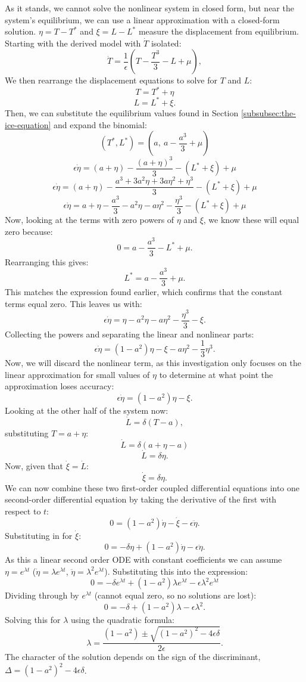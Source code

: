     As it stands, we cannot solve the nonlinear system in closed form, but near the system's equilibrium, we can use a linear approximation with a closed-form solution. $\eta=T-T^*$ and $\xi=L-L^*$ measure the displacement from equilibrium. Starting with the derived model with $\dot T$ isolated:
    \[
        \dot{T}=\frac{1}{\epsilon}\left(T-\frac{T^3}{3}-L+\mu\right),
    \]
    We then rearrange the displacement equations to solve for $T$ and $L$:
    \[
        T=T^*+\eta
    \]
    \[
        L=L^*+\xi.
    \]
    Then, we can substitute the equilibrium values found in Section \ref{subsubsec:the-ice-equation} and expand the binomial:
    \[
        \left(T^*,L^*\right)=\left(a, \ a-\frac{a^3}{3}+\mu\right)
    \]
    \[
        \epsilon\dot \eta=(a+\eta)-\frac{(a+\eta)^3}{3}-(L^*+\xi)+\mu
    \]
    \[
        \epsilon\dot \eta=(a+\eta)-\frac{a^3+3a^2\eta+3a\eta^2+\eta^3}{3}-(L^*+\xi)+\mu
    \]
    \[
        \epsilon\dot\eta=a+\eta-\frac{a^3}{3}-a^2\eta-a\eta^2-\frac{\eta^3}{3}-(L^*+\xi)+\mu
    \]
    Now, looking at the terms with zero powers of $\eta$ and $\xi$, we know these will equal zero because:
    \[
        0=a-\frac{a^3}{3}-L^*+\mu.
    \]
    Rearranging this gives:
    \[
        L^*=a-\frac{a^3}{3}+\mu.
    \]
    This matches the expression found earlier, which confirms that the constant terms equal zero. This leaves us with:
    \[
        \epsilon\dot\eta=\eta-a^2\eta-a\eta^2-\frac{\eta^3}{3}-\xi.
    \]
    Collecting the powers and separating the linear and nonlinear parts:
    \[
        \epsilon\dot\eta=\left(1-a^2\right)\eta-\xi-a\eta^2-\frac{1}{3}\eta^3.
    \]
    Now, we will discard the nonlinear term, as this investigation only focuses on the linear approximation for small values of $\eta$ to determine at what point the approximation loses accuracy:
    \[
        \epsilon\dot\eta=\left(1-a^2\right)\eta-\xi.
    \]
    Looking at the other half of the system now:
    \[
        \dot L=\delta(T-a),
    \]
    substituting $T=a+\eta$:
    \[
        \dot L = \delta(a+\eta-a)
    \]
    \[
        \dot L = \delta\eta.
    \]
    Now, given that $\dot\xi=\dot L$:
    \[
        \dot\xi=\delta\eta.
    \]
    We can now combine these two first-order coupled differential equations into one second-order differential equation by taking the derivative of the first with respect to $t$:
    \[
        0=\left(1-a^2\right)\dot\eta-\dot\xi-\epsilon\ddot\eta.
    \]
    Substituting in for $\dot\xi$:
    \[
        0=-\delta\eta+\left(1-a^2\right)\dot\eta-\epsilon\ddot\eta.
    \]
    As this a linear second order ODE with constant coefficients we can assume $\eta=e^{\lambda t}$ ($\dot\eta=\lambda e^{\lambda t}$, $\ddot\eta=\lambda^2 e^{\lambda t}$). Substituting this into the expression:
    \[
        0=-\delta e^{\lambda t}+\left(1-a^2\right)\lambda e^{\lambda t}-\epsilon\lambda^2 e^{\lambda t}
    \]
    Dividing through by $e^{\lambda t}$ (cannot equal zero, so no solutions are lost):
    \[
        0=-\delta+\left(1-a^2\right)\lambda-\epsilon\lambda^2.
    \]
    Solving this for $\lambda$ using the quadratic formula:
    \[
        \lambda=\frac{\left(1-a^2\right)\pm\sqrt{\left(1-a^2\right)^2-4\epsilon\delta}}{2\epsilon}.
    \]
    The character of the solution depends on the sign of the discriminant, $\Delta=\left(1-a^2\right)^2-4\epsilon\delta$.

